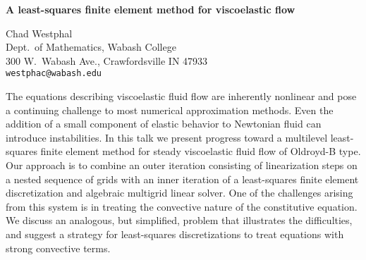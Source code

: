 \documentclass{report}
\begin{document}

\begin{center}
{\large
{\bf A least-squares finite element method for viscoelastic flow}}

	Chad Westphal \\
	Dept.~of Mathematics, Wabash College \\
	300 W.~Wabash Ave., Crawfordsville IN 47933 \\
	{\tt westphac@wabash.edu}
\end{center}
The equations describing viscoelastic fluid flow are
inherently nonlinear and pose a continuing challenge to most
numerical approximation methods. Even the addition of a
small component of elastic behavior to Newtonian fluid can
introduce instabilities. In this talk we present progress
toward a multilevel least-squares finite element method for
steady viscoelastic fluid flow of Oldroyd-B type. Our
approach is to combine an outer iteration consisting of
linearization steps on a nested sequence of grids with an
inner iteration of a least-squares finite element
discretization and algebraic multigrid linear solver. One of
the challenges arising from this system is in treating the
convective nature of the constitutive equation. We discuss
an analogous, but simplified, problem that illustrates the
difficulties, and suggest a strategy for least-squares
discretizations to treat equations with strong convective
terms.



\end{document}
